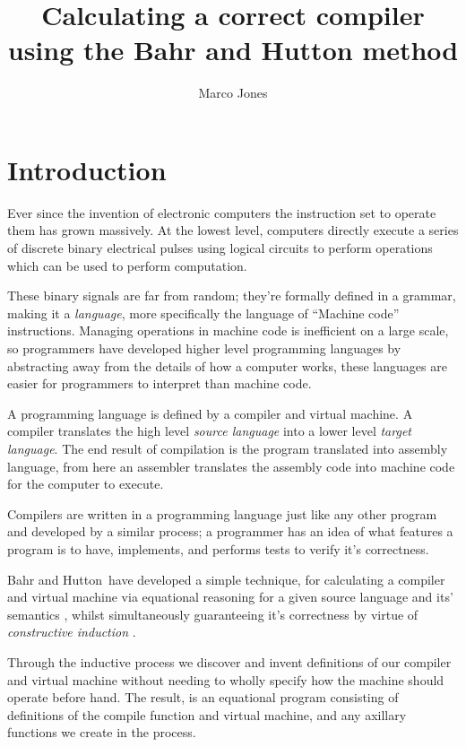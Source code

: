 \documentclass {article}
\title{Calculating a correct compiler using the Bahr and Hutton method}
\author{Marco Jones}
\begin{document}
\begin{titlepage}
\maketitle
\end{titlepage}

\tableofcontents
\clearpage

\newcommand{\BH}{Bahr and Hutton}
\newcommand{\vm}{virtual machine}

\section{Introduction}

Ever since the invention of electronic computers
the instruction set to operate them has grown massively.
At the lowest level, computers directly execute
a series of discrete binary electrical
pulses using logical circuits 
to perform operations which can be used to perform computation.

These binary signals are far from random; they're formally
defined in a grammar, making it a \emph{language},
more specifically the language of ``Machine code'' instructions.
Managing operations in machine code is inefficient on
a large scale,
so programmers have developed 
higher level programming languages
by abstracting away from the details of how a computer works,
these languages are easier for programmers to interpret
than machine code.

A programming language is defined by
a compiler and virtual machine. %
A compiler translates the high level
\emph{source language} into a 
lower level \emph{target language}.
The end result of compilation is the program
translated into assembly language,
from here an assembler translates the assembly code
into machine code for the computer to execute.

Compilers are written in a programming
language just like any other program 
and developed by a similar process;
a programmer has an idea of what features a program
is to have, implements, 
and performs tests to verify it's correctness.

\BH\ have developed a simple technique, for
calculating a compiler and virtual machine via equational reasoning
for a given source language and its' semantics \cite{bandh}, 
whilst simultaneously guaranteeing it's correctness by virtue 
of \emph{constructive induction} \cite{backhouse}.

Through the inductive process we discover 
and invent definitions
of our compiler and virtual machine 
without needing to wholly specify how the 
machine should operate before hand.
The result, is an equational program consisting of
definitions of the compile function and \vm,
and any axillary functions we create in the process.
\end{document}
